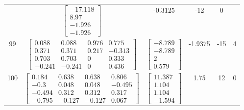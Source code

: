 \documentclass[a4paper,12pt]{article}
\begin{document}
\begin{tabular}{c c c c c c}
&
$\begin{bmatrix} -17.118 \\ 8.97 \\ -1.926 \\ -1.926 \end{bmatrix}$
&
-0.3125
&
-12
&
0
\\
99
&
$\begin{bmatrix} 0.088 & 0.088 & 0.976 & 0.775 \\ 0.371 & 0.371 & 0.217 & -0.313 \\ 0.703 & 0.703 & 0 & 0.333 \\ -0.241 & -0.241 & 0 & 0.436 \end{bmatrix}$
&
$\begin{bmatrix} -8.789 \\ -8.789 \\ 2 \\ 0.579 \end{bmatrix}$
&
-1.9375
&
-15
&
4
\\
100
&
$\begin{bmatrix} 0.184 & 0.638 & 0.638 & 0.806 \\ -0.3 & 0.048 & 0.048 & -0.495 \\ -0.494 & 0.312 & 0.312 & 0.317 \\ -0.795 & -0.127 & -0.127 & 0.067 \end{bmatrix}$
&
$\begin{bmatrix} 11.387 \\ 1.104 \\ 1.104 \\ -1.594 \end{bmatrix}$
&
1.75
&
12
&
0
\\
\end{tabular} \egroup \newpage
\end{document}
